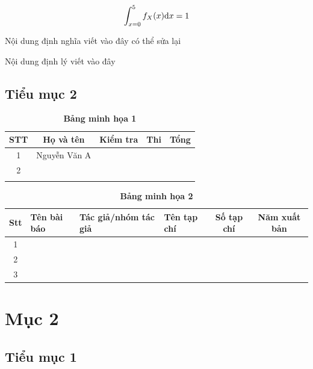\documentclass[a4paper,oneside]{../../styles/thesis}
\begin{document}
\[ \int_{x=0}^5 f_X (x) {\rm d}x=1 \]

\begin{dn}
 Nội dung định nghĩa viết vào đây có thể sửa lại
\end{dn}

\begin{dl}
 Nội dung định lý viết vào đây   
\end{dl}


\subsection{Tiểu mục 2}

\begin{table}[ht]
 \caption{\textbf{Bảng minh họa 1}}
    \centering
    \begin{tabular}{|c|c|c|c|c|}
    \hline
     STT    & Họ và tên & Kiểm tra & Thi & Tổng\\
      \hline
     1    & Nguyễn Văn A &  &  & \\
      \hline
      2   &  &  &  & \\
       \hline
         &  &  &  & \\
       \hline
    \end{tabular} 
\end{table}

\begin{table}[ht]
 \caption{\textbf{Bảng minh họa 2}}
 \centering
\begin{tabular}{|c|l|l|l|c|c|}
		\hline
		\textbf{Stt} &\textbf{Tên bài báo} & \textbf{Tác giả/nhóm tác giả}
		& \textbf{Tên tạp chí} &\textbf{Số tạp chí} & \textbf{Năm xuất bản}
		\\
		\hline
		1 &   &  & &  & \\
		\hline
	2 &   &  & &  & \\
		\hline
        3 &   &  & &  & \\
		\hline
	\end{tabular}
    \end{table}
\section{Mục 2}
\subsection{Tiểu mục 1}
\end{document}
